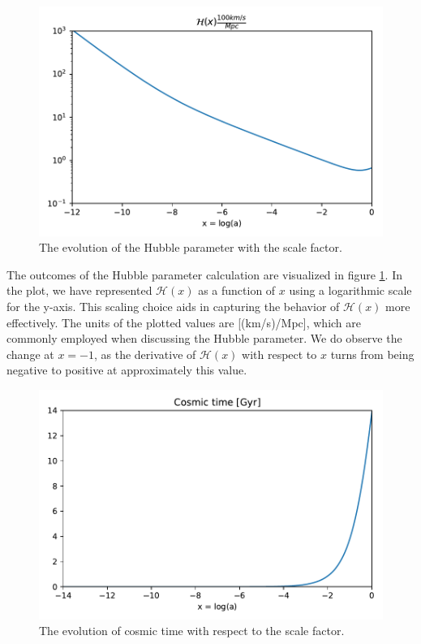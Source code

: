 \documentclass{aa}
\begin{document}
\begin{figure}[h!]
   \includegraphics[scale=0.5]{Figures/milestone_1/Hx.pdf}
   \caption{The evolution of the Hubble parameter with the scale factor.}\label{fig:M1_H}
\end{figure}
The outcomes of the Hubble parameter calculation are visualized in figure \ref{fig:M1_H}. In the plot, we have represented $\mathcal{H}(x)$ as a function of $x$ using a logarithmic scale for the y-axis. This scaling choice aids in capturing the behavior of $\mathcal{H}(x)$ more effectively. The units of the plotted values are [(km/s)/Mpc], which are commonly employed when discussing the Hubble parameter. We do observe the change at $x = -1$, as the derivative of $\mathcal{H}(x)$ with respect to $x$ turns from being negative to positive  at approximately this value. 
\begin{figure}[h!]
   \includegraphics[scale=0.5]{Figures/milestone_1/t.pdf}
   \caption{The evolution of cosmic time with respect to the scale factor.}\label{fig:M1_t}
\end{figure}\\
\end{document}
